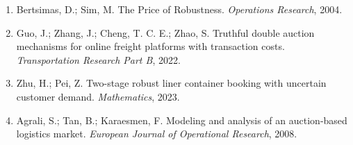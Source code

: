 \documentclass[11pt,a4paper]{article}
\begin{document}
\begin{enumerate}[label={(\arabic*)},leftmargin=*]
\item Bertsimas, D.; Sim, M. The Price of Robustness. \textit{Operations Research}, 2004.
\item Guo, J.; Zhang, J.; Cheng, T. C. E.; Zhao, S. Truthful double auction mechanisms for online freight platforms with transaction costs. \textit{Transportation Research Part B}, 2022.
\item Zhu, H.; Pei, Z. Two-stage robust liner container booking with uncertain customer demand. \textit{Mathematics}, 2023.
\item Agrali, S.; Tan, B.; Karaesmen, F. Modeling and analysis of an auction-based logistics market. \textit{European Journal of Operational Research}, 2008.
\end{enumerate}
\end{document}
